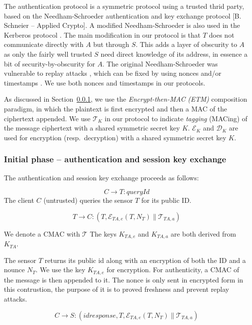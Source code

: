 The authentication protocol is a symmetric protocol using a trusted thrid party, based on the Needham-Schroeder authentication and key exchange protocol  [B. Schneier -- Applied Crypto]. A modified Needham-Schroeder is also used in the Kerberos protocol . The main modification in our protocol is that $T$ does not communicate directly with $A$ but through $S$. This adds a layer of obscurity to $A$ as only the fairly well trusted $S$ need direct knowledge of its address, in essence a bit of security-by-obscurity for $A$.
%
The original Needham-Schroeder was vulnerable to replay attacks , which can be fixed by using nonces and/or timestamps \cite{needham1987}. We use both nonces and timestamps in our protocols.

As discussed in Section~\ref{}, we use the \textit{Encrypt-then-MAC (ETM)}  composition paradigm, in which the plaintext is first encrypted and then a MAC of the ciphertext appended. We use $\mathcal{T}_K$ in our protocol to indicate \textit{tagging} (MACing) of the message ciphertext with a shared symmetric secret key $K$. $\mathcal{E}_K$ and $\mathcal{D}_K$ are used for encryption (resp.\ decryption) with a shared symmetric secret key $K$.

\subsubsection{Initial phase -- authentication and session key exchange}

The authentication and session key exchange proceeds as follows:

\[
C \rightarrow T: \textit{queryId}
\]
The client $C$ (untrusted) queries the sensor $T$ for its public ID.


\[
T \rightarrow C: (T, \mathcal{E}_{TA,e}(T, N_T) \parallel \mathcal{T}_{TA,a})
\]

We denote a CMAC with $\mathcal{T}$ The keys $K_{TA,e}$ and $K_{TA,a}$
are both derived from $K_{TA}$.

The sensor $T$ returns its public id along with an encryption of both
the ID and a nounce $N_T$. We use the key $K_{TA,e}$ for
encryption. For authenticity, a CMAC of the message is then appended
to it. The nonce is only sent in encrypted form in this contrustion,
the purpose of it is to proved freshness and prevent replay attacks.

\[
C\rightarrow S: (idresponse,T,\mathcal{E}_{TA,e}(T,N_T) \parallel \mathcal{T}_{TA,a})
\]

